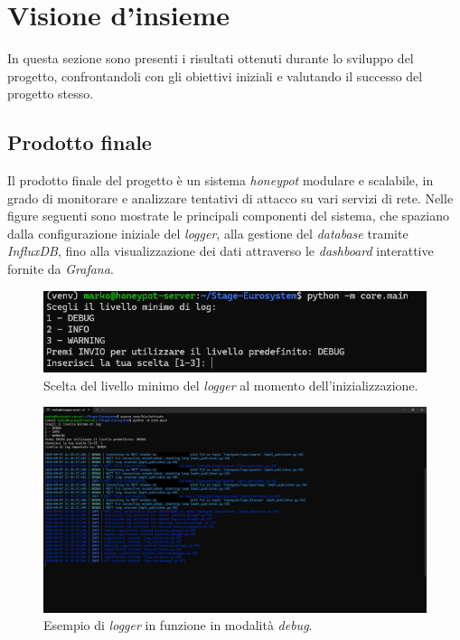 \section{Visione d'insieme}
In questa sezione sono presenti i risultati ottenuti durante lo sviluppo del progetto, confrontandoli con gli obiettivi iniziali e valutando il successo del progetto stesso.
\subsection{Prodotto finale}
Il prodotto finale del progetto è un sistema \textit{honeypot} modulare e scalabile, in grado di monitorare e analizzare tentativi di attacco su vari servizi di rete.
Nelle figure seguenti sono mostrate le principali componenti del sistema, che spaziano dalla configurazione iniziale del \textit{logger}, alla gestione del \textit{database} tramite \textit{InfluxDB}, fino alla visualizzazione dei dati attraverso le \textit{dashboard} interattive fornite da \textit{Grafana}.
\begin{figure}[H]
    \begin{center}
    \includegraphics[width=\textwidth]{img/environment.png}
    \caption{Scelta del livello minimo del \textit{logger} al momento dell'inizializzazione.}
    \label{fig:environment}
    \end{center}
\end{figure}
\begin{figure}[H]
    \begin{center}
    \includegraphics[width=\textwidth]{img/logger.png}
    \caption{Esempio di \textit{logger} in funzione in modalità \textit{debug}.}
    \label{fig:logger}
    \end{center}
\end{figure}
